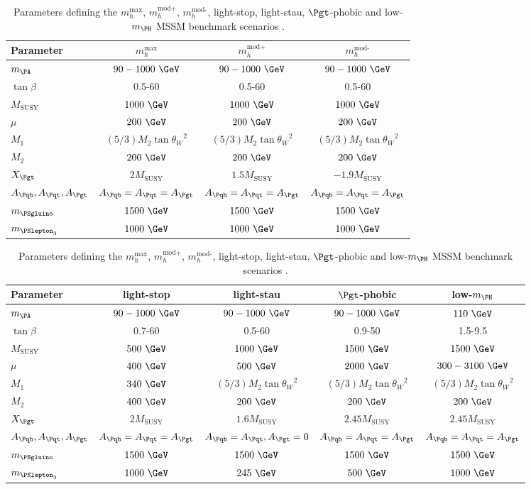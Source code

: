 \begin{table}[tbh]
\begin{tabular}{|l|c|c|c|}
\hline
Parameter & $m_{h}^{\text{max}}$ & $m_{h}^{\text{mod+}}$ & $m_{h}^{\text{mod-}}$ \\
\hline
$m_{\PA}$ & $90-1000~\GeV$ & $90-1000~\GeV$ & $90-1000~\GeV$\\
$\tan\beta$ & 0.5-60 & 0.5-60 & 0.5-60 \\
$M_{\text{SUSY}}$ & $1000~\GeV$ & $1000~\GeV$ & $1000~\GeV$\\
$\mu$ & $200~\GeV$ & $200~\GeV$ & $200~\GeV$\\
$M_{1}$ & $(5/3)M_{2}\tan{\theta_{W}}^{2}$ & $(5/3)M_{2}\tan{\theta_{W}}^{2}$ & $(5/3)M_{2}\tan{\theta_{W}}^{2}$\\
$M_{2}$ & $200~\GeV$ & $200~\GeV$ & $200~\GeV$ \\
$X_{\Pgt}$ & $2M_{\text{SUSY}}$ & $1.5M_{\text{SUSY}}$ & $-1.9M_{\text{SUSY}}$ \\
$A_{\Pqb},A_{\Pqt},A_{\Pgt}$ & $A_{\Pqb} = A_{\Pqt} = A_{\Pgt}$ & $A_{\Pqb} = A_{\Pqt} = A_{\Pgt}$ & $A_{\Pqb} = A_{\Pqt} = A_{\Pgt}$\\
$m_{\PSgluino}$ & $1500~\GeV$ & $1500~\GeV$ & $1500~\GeV$\\
$m_{\PSlepton_{3}}$ & $1000~\GeV$ & $1000~\GeV$ & $1000~\GeV$\\
\hline
\end{tabular}
\begin{tabular}{|l|c|c|c|c|}
\hline
Parameter & light-stop & light-stau & $\Pgt$-phobic & low-$m_{\PH}$ \\
\hline
$m_{\PA}$ & $90-1000~\GeV$ & $90-1000~\GeV$ & $90-1000~\GeV$ & $110~\GeV$\\
$\tan\beta$ & 0.7-60 & 0.5-60 & 0.9-50 & 1.5-9.5\\
$M_{\text{SUSY}}$ & $500~\GeV$ & $1000~\GeV$ & $1500~\GeV$ & $1500~\GeV$\\
$\mu$ & $400~\GeV$ & $500~\GeV$ & $2000~\GeV$ & $300-3100~\GeV$\\
$M_{1}$ & $340~\GeV$ & $(5/3)M_{2}\tan{\theta_{W}}^{2}$ & $(5/3)M_{2}\tan{\theta_{W}}^{2}$  & $(5/3)M_{2}\tan{\theta_{W}}^{2}$ \\
$M_{2}$ & $400~\GeV$ & $200~\GeV$ & $200~\GeV$ & $200~\GeV$\\
$X_{\Pgt}$ & $2M_{\text{SUSY}}$ & $1.6M_{\text{SUSY}}$ & $2.45M_{\text{SUSY}}$ & $2.45M_{\text{SUSY}}$ \\
$A_{\Pqb},A_{\Pqt},A_{\Pgt}$ & $A_{\Pqb} = A_{\Pqt} = A_{\Pgt}$ & $A_{\Pqb} = A_{\Pqt}, A_{\Pgt} = 0$ & $A_{\Pqb} = A_{\Pqt} = A_{\Pgt}$ & $A_{\Pqb} = A_{\Pqt} = A_{\Pgt}$ \\
$m_{\PSgluino}$ & $1500~\GeV$ & $1500~\GeV$  & $1500~\GeV$ & $1500~\GeV$ \\
$m_{\PSlepton_{3}}$ & $1000~\GeV$ & $245~\GeV$ & $500~\GeV$ &  $1000~\GeV$ \\
\hline
\end{tabular}
\caption{Parameters defining the $m_{h}^{\text{max}}$, $m_{h}^{\text{mod+}}$,
$m_{h}^{\text{mod-}}$, light-stop, light-stau, $\Pgt$-phobic and
low-$m_{\PH}$ MSSM benchmark scenarios \cite{HIG-13-021}.}
\label{tab:mssmbenchmarks}
\end{table}

